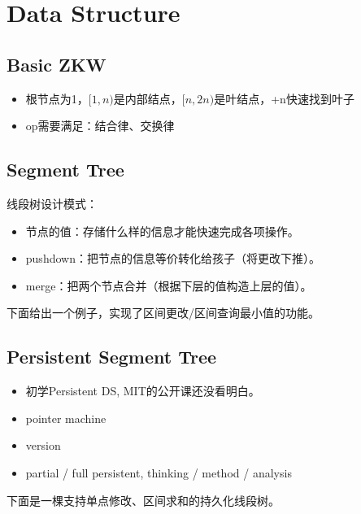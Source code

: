 \newpage
\section{Data Structure}
	\subsection{Basic ZKW}
		\begin{flushleft}
			\begin{itemize}
				\item 根节点为1，$[1, n)$是内部结点，$[n, 2n)$是叶结点，+n快速找到叶子
				\item op需要满足：结合律、交换律
			\end{itemize}
		\end{flushleft}
		
	\newpage
	\subsection{Segment Tree}
		\begin{flushleft}
			线段树设计模式：
			\begin{itemize}
				\item 节点的值：存储什么样的信息才能快速完成各项操作。
				\item pushdown：把节点的信息等价转化给孩子（将更改下推）。
				\item merge：把两个节点合并（根据下层的值构造上层的值）。
			\end{itemize}
			下面给出一个例子，实现了区间更改/区间查询最小值的功能。
		\end{flushleft}
		
	\newpage
	\subsection{Persistent Segment Tree}
		\begin{flushleft}
			\begin{itemize}
				\item 初学Persistent DS, MIT的公开课还没看明白。
				\item pointer machine
				\item version
				\item partial / full persistent, thinking / method / analysis
			\end{itemize}
			下面是一棵支持单点修改、区间求和的持久化线段树。
		\end{flushleft}
		
	\newpage
